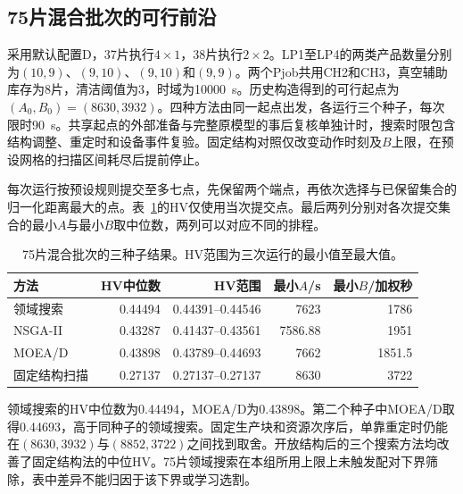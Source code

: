 \subsection{75片混合批次的可行前沿}

采用默认配置D，37片执行$4\times1$，38片执行$2\times2$。LP1至LP4的两类产品数量分别为$(10,9)$、$(9,10)$、$(9,10)$和$(9,9)$。两个Pjob共用CH2和CH3，真空辅助库存为8片，清洁阈值为3，时域为10000~s。历史构造得到的可行起点为$(A_0,B_0)=(8630,3932)$。四种方法由同一起点出发，各运行三个种子，每次限时90~s。共享起点的外部准备与完整原模型的事后复核单独计时，搜索时限包含结构调整、重定时和设备事件复验。固定结构对照仅改变动作时刻及$B$上限，在预设网格的扫描区间耗尽后提前停止。

每次运行按预设规则提交至多七点，先保留两个端点，再依次选择与已保留集合的归一化距离最大的点。表~\ref{tab:pareto75}的HV仅使用当次提交点。最后两列分别对各次提交集合的最小$A$与最小$B$取中位数，两列可以对应不同的排程。
\begin{table}[!htbp]\centering\small
\caption{75片混合批次的三种子结果。HV范围为三次运行的最小值至最大值。}\label{tab:pareto75}
\begin{tabular}{lrrrr}\toprule
方法 & HV中位数 & HV范围 & 最小$A$/s & 最小$B$/加权秒 \\\midrule
领域搜索 & 0.44494 & 0.44391--0.44546 & 7623 & 1786 \\
NSGA-II & 0.43287 & 0.41437--0.43561 & 7586.88 & 1951 \\
MOEA/D & 0.43898 & 0.43789--0.44693 & 7662 & 1851.5 \\
固定结构扫描 & 0.27137 & 0.27137--0.27137 & 8630 & 3722 \\
\bottomrule\end{tabular}
\end{table}

领域搜索的HV中位数为0.44494，MOEA/D为0.43898。第二个种子中MOEA/D取得0.44693，高于同种子的领域搜索。固定生产块和资源次序后，单靠重定时仍能在$(8630,3932)$与$(8852,3722)$之间找到取舍。开放结构后的三个搜索方法均改善了固定结构法的中位HV。75片领域搜索在本组所用上限上未触发配对下界筛除，表中差异不能归因于该下界或学习选割。

